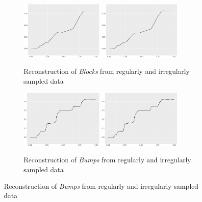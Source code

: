 \begin{figure}[h!]
    \centering
    \begin{subfigure}{\textwidth}
    \centering
    \includegraphics[width=0.45\textwidth]{Chapters/02TractorSplineTheory/plot/ggplot/ggblocksreg.pdf}
    \includegraphics[width=0.45\textwidth]{Chapters/02TractorSplineTheory/plot/ggplot/ggblocksire.pdf}
    \caption{Reconstruction of \textit{Blocks} from regularly and irregularly sampled data}
    \end{subfigure}
    \begin{subfigure}{\textwidth}
    \centering
    \includegraphics[width=0.45\textwidth]{Chapters/02TractorSplineTheory/plot/ggplot/ggbumpsreg.pdf}
    \includegraphics[width=0.45\textwidth]{Chapters/02TractorSplineTheory/plot/ggplot/ggbumpsire.pdf}
    \caption{Reconstruction of \textit{Bumps} from regularly and irregularly sampled data}

\end{subfigure}
\end{figure}
